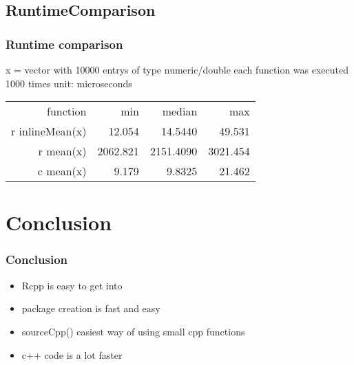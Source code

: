 \documentclass[hyperef={
    colorlinks=true,
    linkcolor=blue,
    filecolor=black,
urlcolor=blue}
]{beamer}
\begin{document}
\subsection{RuntimeComparison}
\begin{frame}
\frametitle{Runtime comparison}

x = vector with 10000 entrys of type numeric/double\newline
each function was executed 1000 times\newline
\newline
unit: microseconds\newline

\begin{tabular}{rrrr}
function & min & median & max \\
r inlineMean(x) & 12.054 & 14.5440 & 49.531 \\
r mean(x) & 2062.821 & 2151.4090 & 3021.454 \\
c mean(x) & 9.179 & 9.8325 & 21.462 \\
\end{tabular}
\end{frame}

\section{Conclusion}
\begin{frame}
\frametitle{Conclusion}
\begin{itemize}
\item Rcpp is easy to get into
\item package creation is fast and easy
\item sourceCpp() easiest way of using small
      cpp functions
\item c++ code is a lot faster
    
\end{itemize}
\end{frame}

\end{document}
